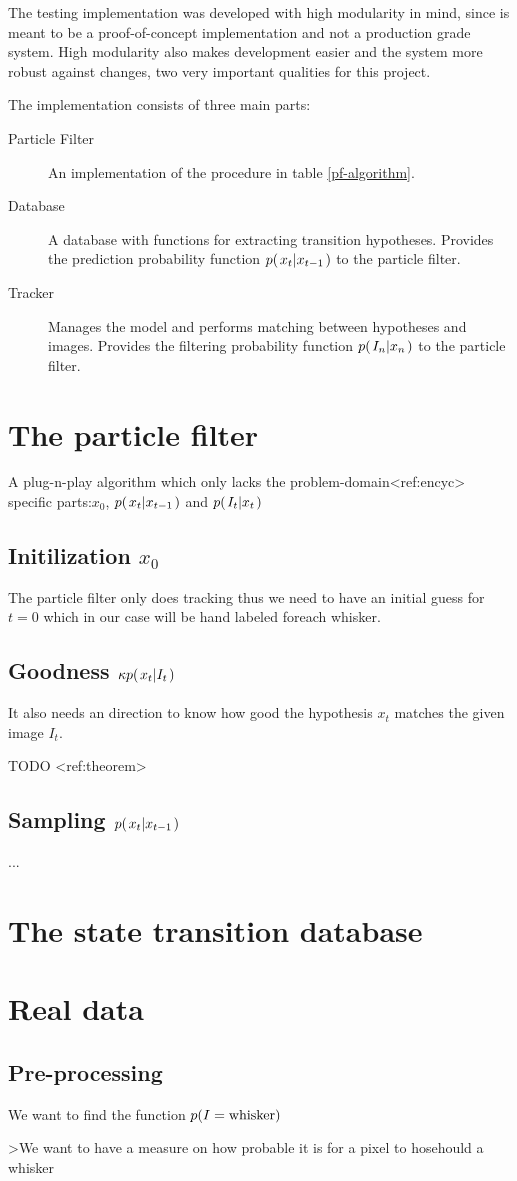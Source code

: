 The testing implementation was developed with high modularity in mind, since is meant to be a proof-of-concept implementation and not a production grade system. High modularity also makes development easier and the system more robust against changes, two very important qualities for this project.


The implementation consists of three main parts:
\begin{description}
  \item[Particle Filter] An implementation of the procedure in table \ref{pf-algorithm}.
  \item[Database] A database with functions for extracting transition hypotheses. Provides the prediction probability function $p{(\left. x_t \middle\vert x_{t-1} \right.)}$ to the particle filter.
  \item[Tracker] Manages the model and performs matching between hypotheses and images. Provides the filtering probability function $p{(\left. I_n \middle\vert x_n \right.)}$ to the particle filter.
\end{description}




\section{The particle filter}
    A plug-n-play algorithm which only lacks the problem-domain<ref:encyc> specific parts:$x_0$, $p{(\left. x_t \middle\vert x_{t-1} \right.)}$ and $p{(\left. I_t \middle\vert x_t \right.)}$
    \subsection{Initilization $x_0$}
        The particle filter only does tracking thus we need to have an initial guess for $t=0$ which in our case will be hand labeled foreach whisker.
    \subsection{Goodness $\kappa p{(\left. x_t \middle\vert I_t \right.)}$}
        It also needs an direction to know how good the hypothesis $x_t$ matches the given image $I_t$.

        TODO <ref:theorem>
    \subsection{Sampling $p{(\left. x_t \middle\vert x_{t-1} \right.)}$}

        ...

\section{The state transition database}





\section{Real data}
    \subsection{Pre-processing}

    We want to find the function $p{(I=\text{whisker})}$

    >We want to have a measure on how probable it is for a pixel to hosehould a whisker






